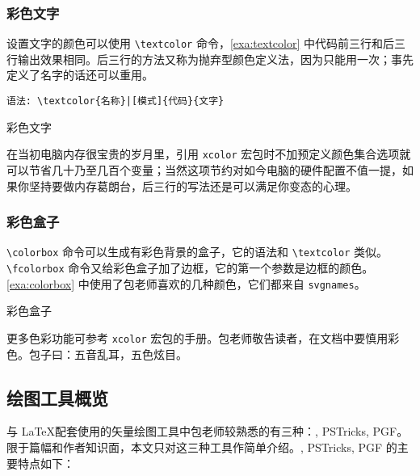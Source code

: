 \subsubsection{彩色文字}

设置文字的颜色可以使用 \verb|\textcolor| 命令，\autoref{exa:textcolor} 中代码前三行和后三行输出效果相同。后三行的方法又称为抛弃型颜色定义法，因为只能用一次；事先定义了名字的话还可以重用。

\verb+语法: \textcolor{名称}|[模式]{代码}{文字}+

\begin{example}[h]
\caption{彩色文字}
\label{exa:textcolor}
\end{example}

在当初电脑内存很宝贵的岁月里，引用 \texttt{xcolor} 宏包时不加预定义颜色集合选项就可以节省几十乃至几百个变量；当然这项节约对如今电脑的硬件配置不值一提，如果你坚持要做内存葛朗台，后三行的写法还是可以满足你变态的心理。

\subsubsection{彩色盒子}

\verb|\colorbox| 命令可以生成有彩色背景的盒子，它的语法和 \verb|\textcolor| 类似。\verb|\fcolorbox| 命令又给彩色盒子加了边框，它的第一个参数是边框的颜色。\autoref{exa:colorbox} 中使用了包老师喜欢的几种颜色，它们都来自 \texttt{svgnames}。

\begin{example}[h]
\begin{BTDemo}[numbers=left]
\colorbox{Lavender}{}
\colorbox{SkyBlue}{}
\colorbox{Wheat}{}
\end{BTDemo}
\caption{彩色盒子}
\label{exa:colorbox}
\end{example}

更多色彩功能可参考 \texttt{xcolor} 宏包的手册\citep{Kern_xcolor}。包老师敬告读者，在文档中要慎用彩色。包子曰：五音乱耳，五色炫目。

\subsection{绘图工具概览}
\label{sec:graph_tools}

与 \LaTeX 配套使用的矢量绘图工具中包老师较熟悉的有三种：\MP, PSTricks, PGF。限于篇幅和作者知识面，本文只对这三种工具作简单介绍。\MP, PSTricks, PGF 的主要特点如下：


